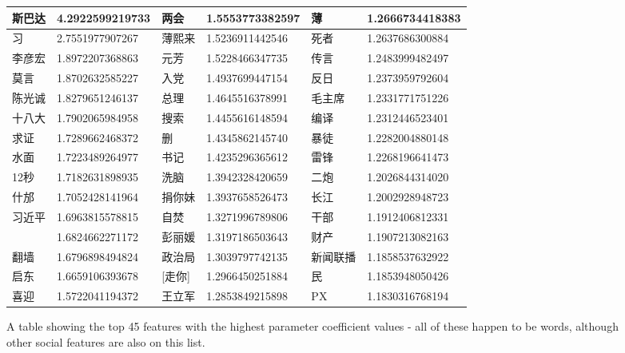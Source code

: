 \documentclass{article} %
\begin{document}
\begin{CJK*}{UTF8}{gbsn}
\begin{figure}[!htb]
	\begin{center}
		    \begin{tabular}{ | l | l | l | l | l | l |}
		    \hline
		    斯巴达 & 4.2922599219733 & 两会 & 1.5553773382597& 薄 & 1.2666734418383 \\ \hline
		    习 & 2.7551977907267& 薄熙来 & 1.5236911442546 & 死者 & 1.2637686300884\\ \hline
		   李彦宏 & 1.8972207368863 & 元芳 & 1.5228466347735 & 传言 & 1.2483999482497\\ \hline
		  莫言 & 1.8702632585227 & 入党 & 1.4937699447154& 反日 & 1.2373959792604\\\hline
		   	陈光诚 & 1.8279651246137& 总理 & 1.4645516378991& 毛主席 & 1.2331771751226\\\hline
		    十八大 & 1.7902065984958 & 搜索 & 1.4455616148594 & 编译 & 1.2312446523401\\\hline
		   求证 & 1.7289662468372 & 删 & 1.4345862145740 & 暴徒 & 1.2282004880148\\\hline
		   水面 & 1.7223489264977& 书记 & 1.4235296365612 & 雷锋 & 1.2268196641473\\\hline
		    12秒 & 1.7182631898935 & 洗脑 & 1.3942328420659 & 二炮 & 1.2026844314020\\\hline
		   什邡 & 1.7052428141964 & 捐你妹 & 1.3937658526473 & 长江 & 1.2002928948723\\\hline
		   习近平 & 1.6963815578815 & 自焚 & 1.3271996789806 & 干部 & 1.1912406812331\\\hline
		    [国旗] & 1.6824662271172 & 彭丽媛 & 1.3197186503643& 财产 & 1.1907213082163\\\hline
		   翻墙 & 1.6796898494824& 政治局 & 1.3039797742135 & 新闻联播 & 1.1858537632922\\\hline
		    启东 & 1.6659106393678 & [走你] & 1.2966450251884& 民 & 1.1853948050426\\\hline
		    喜迎 & 1.5722041194372 & 王立军 & 1.2853849215898 & PX & 1.1830316768194\\\hline
		    \end{tabular}
	\end{center}
\caption{A table showing the top 45 features with the highest parameter coefficient values - all of these happen to be words, although other social features are also on this list.}
\vspace{-10pt}
\end{figure}


\end{CJK*}
\end{document}
